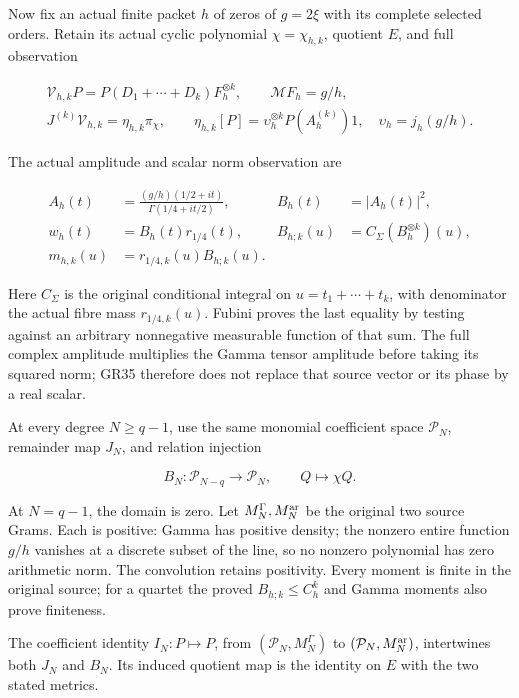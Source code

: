 Now fix an actual finite packet \(h\) of zeros of \(g=2\xi\) with its complete selected orders. Retain its actual cyclic polynomial \(\chi=\chi_{h,k}\), quotient \(E\), and full observation

\[
\begin{gathered}
\mathcal V_{h,k}P=P(D_1+\cdots+D_k)F_h^{\otimes k},\qquad
\mathcal MF_h=g/h,\\
J^{(k)}\mathcal V_{h,k}=\eta_{h,k}\pi_\chi,\qquad
\eta_{h,k}[P]=\upsilon_h^{\otimes k}P(A_h^{(k)})1,\quad
\upsilon_h=j_h(g/h).
\end{gathered}
\tag{GR34}
\]

The actual amplitude and scalar norm observation are

\[
\begin{aligned}
A_h(t)&=\frac{(g/h)(1/2+it)}{\Gamma(1/4+it/2)},&
B_h(t)&=|A_h(t)|^2,\\
w_h(t)&=B_h(t)r_{1/4}(t),&
B_{h;k}(u)&=C_\Sigma(B_h^{\otimes k})(u),\\
m_{h,k}(u)&=r_{1/4,k}(u)B_{h;k}(u).
\end{aligned}
\tag{GR35}
\]

Here \(C_\Sigma\) is the original conditional integral on \(u=t_1+\cdots+t_k\), with denominator the actual fibre mass \(r_{1/4,k}(u)\). Fubini proves the last equality by testing against an arbitrary nonnegative measurable function of that sum. The full complex amplitude multiplies the Gamma tensor amplitude before taking its squared norm; GR35 therefore does not replace that source vector or its phase by a real scalar.

At every degree \(N\ge q-1\), use the same monomial coefficient space \(\mathcal P_N\), remainder map \(J_N\), and relation injection

\[
B_N:\mathcal P_{N-q}\longrightarrow\mathcal P_N,\qquad Q\longmapsto\chi Q.
\tag{GR36}
\]

At \(N=q-1\), the domain is zero. Let \(M_N^\Gamma,M_N^{\rm ar}\) be the original two source Grams. Each is positive: Gamma has positive density; the nonzero entire function \(g/h\) vanishes at a discrete subset of the line, so no nonzero polynomial has zero arithmetic norm. The convolution retains positivity. Every moment is finite in the original source; for a quartet the proved \(B_{h;k}\le C_h^k\) and Gamma moments also prove finiteness.

The coefficient identity \(I_N:P\mapsto P\), from \((\mathcal P_N,M_N^\Gamma)\) to \((\mathcal P_N,M_N^{\rm ar})\), intertwines both \(J_N\) and \(B_N\). Its induced quotient map is the identity on \(E\) with the two stated metrics.

